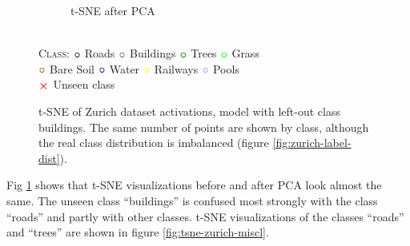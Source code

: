 \documentclass[10pt]{article}
\newcommand{\legendBullet}{
    \textsc{Class}: 
    ${\color{black}\boldsymbol{\circ}}$ Roads
    ${\color{buildings}\boldsymbol{\circ}}$ Buildings
    ${\color{trees}\boldsymbol{\circ}}$ Trees
    ${\color{grass}\boldsymbol{\circ}}$ Grass\\
    ${\color{baresoil}\boldsymbol{\circ}}$ Bare Soil
    ${\color{water}\boldsymbol{\circ}}$ Water
    ${\color{railways}\boldsymbol{\circ}}$ Railways
    ${\color{swimmingpools}\boldsymbol{\circ}}$ Pools\\
    ${\color{unseen}\boldsymbol{\times}}$ Unseen class
    }
\begin{document}
\begin{figure}[H]
\begin{subfigure}{.5\textwidth}
        \caption{\gls{t-SNE} after \gls{PCA}}
    \end{subfigure}
    \\[.2cm]
    \legendBullet
    \caption{\gls{t-SNE} of Zurich dataset activations, model with left-out class buildings. The same number of points are shown by class, although the real class distribution is imbalanced (figure \ref{fig:zurich-label-dist}).}
    \label{fig:tsne-zurich}
\end{figure}

Fig \ref{fig:tsne-zurich} shows that \gls{t-SNE} visualizations before and after \gls{PCA} look almost the same. The unseen class ``buildings'' is confused most strongly with the class ``roads'' and partly with other classes. \gls{t-SNE} visualizations of the classes ``roads'' and ``trees''  are shown in figure \ref{fig:tsne-zurich-miscl}.
\end{document}

